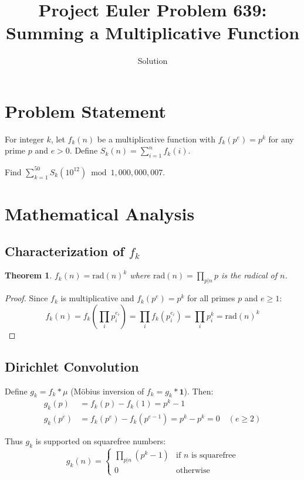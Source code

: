 \documentclass[12pt]{article}
\title{Project Euler Problem 639: Summing a Multiplicative Function}
\author{Solution}
\date{}
\newtheorem{theorem}{Theorem}
\theoremstyle{definition}
\begin{document}
\maketitle

\section{Problem Statement}

For integer $k$, let $f_k(n)$ be a multiplicative function with $f_k(p^e) = p^k$ for any prime $p$ and $e > 0$. Define $S_k(n) = \sum_{i=1}^n f_k(i)$.

Find $\displaystyle\sum_{k=1}^{50} S_k(10^{12}) \bmod 1{,}000{,}000{,}007$.

\section{Mathematical Analysis}

\subsection{Characterization of $f_k$}

\begin{theorem}
$f_k(n) = \text{rad}(n)^k$ where $\text{rad}(n) = \prod_{p | n} p$ is the radical of $n$.
\end{theorem}

\begin{proof}
Since $f_k$ is multiplicative and $f_k(p^e) = p^k$ for all primes $p$ and $e \ge 1$:
\[
f_k(n) = f_k\left(\prod_{i} p_i^{e_i}\right) = \prod_i f_k(p_i^{e_i}) = \prod_i p_i^k = \text{rad}(n)^k
\]
\end{proof}

\subsection{Dirichlet Convolution}

Define $g_k = f_k * \mu$ (M\"obius inversion of $f_k = g_k * \mathbf{1}$). Then:
\begin{align}
g_k(p) &= f_k(p) - f_k(1) = p^k - 1 \\
g_k(p^e) &= f_k(p^e) - f_k(p^{e-1}) = p^k - p^k = 0 \quad (e \ge 2)
\end{align}

Thus $g_k$ is supported on squarefree numbers:
\[
g_k(n) = \begin{cases} \prod_{p|n}(p^k - 1) & \text{if } n \text{ is squarefree} \\ 0 & \text{otherwise} \end{cases}
\]
\end{document}
